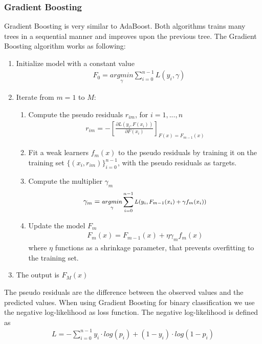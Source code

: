 \documentclass[a4paper,twocolumn]{article}
\begin{document}
\subsubsection{Gradient Boosting}
Gradient Boosting is very similar to AdaBoost. Both algorithms trains many trees in a sequential manner and improves upon the previous tree. The Gradient Boosting algorithm works as following:
\begin{enumerate}
    \item Initialize model with a constant value
    \begin{align}
        F_{0} = \underset{\gamma}{argmin}\sum_{i=0}^{n-1}L(y_{i},\gamma)
    \end{align}
    \item Iterate from $m=1$ to $M$:
    \begin{enumerate}[label=(\alph*)]
        \item Compute the pseudo residuals $r_{im}$, for $i = 1, ..., n$
        \begin{align}
            r_{im} = - \left[\frac{\partial L(y_{i}, F(x_{i}))}{\partial F(x_{i})}\right]_{F(x)=F_{m-1}(x)}
        \end{align}
        \item Fit a weak learners $f_{m}(x)$ to the pseudo residuals by training it on the training set $\{(x_{i}, r_{im})\}_{i=0}^{n-1}$, with the pseudo residuals as targets.
        \item Compute the multiplier $\gamma_{m}$
        \begin{align}
            \tiny
            \gamma_{m}=\text{\footnotesize$ \underset{\gamma}{argmin}\sum_{i=0}^{n-1}L(y_{i},F_{m-1}(x_{i})+\gamma f_{m}(x_{i}))$}
        \end{align}
        \item Update the model $F_{m}$
        \begin{align}
            F_{m}(x)=F_{m-1}(x) + \eta\gamma_{m}f_{m}(x)
        \end{align}
        where $\eta$ functions as a shrinkage parameter, that prevents overfitting to the training set.
    \end{enumerate}
    \item The output is $F_{M}(x)$
\end{enumerate}
The pseudo residuals are the difference between the observed values and the predicted values. When using Gradient Boosting for binary classification we use the negative log-likelihood as loss function. The negative log-likelihood is defined as
\begin{align}
    L = -\sum_{i=0}^{n-1}y_{i}\cdot log(p_{i})+(1-y_{i})\cdot log(1-p_{i})
\end{align}
\end{document}
